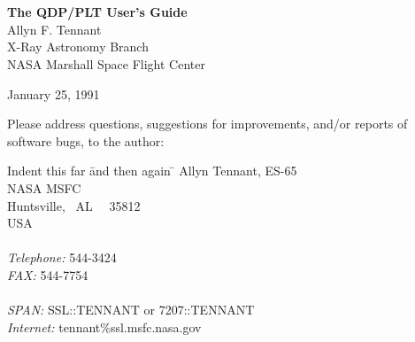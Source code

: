 \chapter*{}
\thispagestyle{empty}
\raggedbottom
\vspace{1.8cm}
\begin{center}
{\LARGE \bf The QDP/PLT User's Guide}\\

\bigskip
{\large Allyn F. Tennant}\\

\smallskip
{X-Ray Astronomy Branch\\
NASA Marshall Space Flight Center\\}

\vspace{3.6cm}
January 25, 1991
\end{center}

\vspace{3.8cm}
\noindent
Please address questions, suggestions for improvements,
and/or reports of software bugs, to the author:

\begin{tabbing}
Indent this far \=  and then again \= \kill
\> \> Allyn Tennant, ES-65\\
\> \> NASA MSFC\\
\> \> Huntsville, \ AL \ \ 35812\\
\> \> USA\\
\> \> \\
\> {\it Telephone:}  544-3424\\
\> {\it FAX:}        544-7754\\
\> \> \\
\> {\it SPAN:}      \> SSL::TENNANT or 7207::TENNANT\\
\> {\it Internet:}  \> tennant\%ssl.msfc.nasa.gov\\
\end{tabbing}

\newpage
\thispagestyle{empty}
\vspace{7cm}
\vfill
\mbox{}
\newpage
